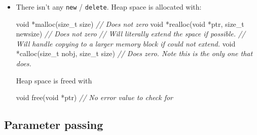 \documentclass[]{article}
\newenvironment{Shaded}{}{}
\newcommand{\DataTypeTok}[1]{\textcolor[rgb]{0.56,0.13,0.00}{#1}}
\newcommand{\CommentTok}[1]{\textcolor[rgb]{0.38,0.63,0.69}{\textit{#1}}}
\newcommand{\NormalTok}[1]{#1}
\begin{document}
\begin{itemize}
\item
  There isn't any \texttt{new} / \texttt{delete}. Heap space is
  allocated with:

\begin{Shaded}
\begin{Highlighting}[]
\DataTypeTok{void}\NormalTok{ *malloc(}\DataTypeTok{size_t}\NormalTok{ size)}
\CommentTok{// Does not zero}
\DataTypeTok{void}\NormalTok{ *realloc(}\DataTypeTok{void}\NormalTok{ *ptr, }\DataTypeTok{size_t}\NormalTok{ newsize)}
\CommentTok{// Does not zero}
\CommentTok{// Will literally extend the space if possible.}
\CommentTok{// Will handle copying to a larger memory block if could not extend.}
\DataTypeTok{void}\NormalTok{ *calloc(}\DataTypeTok{size_t}\NormalTok{ nobj, }\DataTypeTok{size_t}\NormalTok{ size)}
\CommentTok{// Does zero. Note this is the only one that does.}
\end{Highlighting}
\end{Shaded}

  Heap space is freed with

\begin{Shaded}
\begin{Highlighting}[]
\DataTypeTok{void}\NormalTok{ free(}\DataTypeTok{void}\NormalTok{ *ptr) }\CommentTok{// No error value to check for}
\end{Highlighting}
\end{Shaded}
\end{itemize}

\subsection{\texorpdfstring{\textbf{Parameter
passing}}{Parameter passing}}\label{header-n40}
\end{document}
